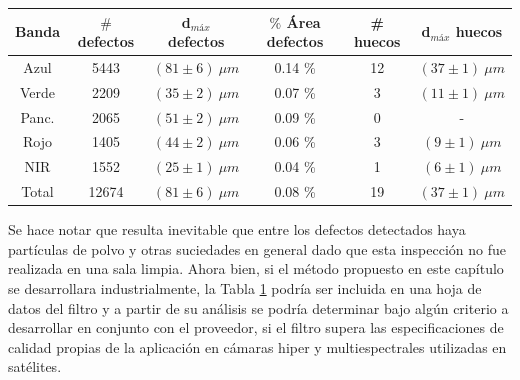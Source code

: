 \begin{table}[H]
\begin{center}
\begin{tabular}{ |c|c|c|c|c|c|}    \toprule
Banda & $\#$ defectos & d$_{máx}$ defectos & $\%$ Área defectos & \# huecos & d$_{máx}$ huecos \\\midrule
\rowcolor{blue!15} Azul   & 5443 & $(81 \pm 6)~ \mu m$ & 0.14 \% &12  & $(37 \pm 1)~ \mu m$  \\ 
\rowcolor{green!50} Verde  & 2209 & $(35 \pm 2)~ \mu m$ & 0.07 \% &3 & $(11 \pm 1)~ \mu m$\\ 
Panc. & 2065 & $(51 \pm 2)~ \mu m$ & 0.09 \% &0 & -\\
\rowcolor{red!50} Rojo  & 1405  &$(44 \pm 2)~ \mu m$& 0.06 \% &3 & $(9 \pm 1)~ \mu m$\\
\rowcolor{maroon!20} NIR   & 1552 & $(25 \pm 1)~ \mu m$ & 0.04 \% &1 & $(6 \pm 1)~ \mu m$ \\ \midrule
Total   & 12674 & $(81 \pm 6)~ \mu m$ & 0.08 \% & 19 & $(37 \pm 1)~ \mu m$ \\
\bottomrule
 \hline
\end{tabular}
\end{center}
 \label{tabpobb}
\end{table}

Se hace notar que resulta inevitable que entre los defectos detectados haya partículas de polvo y otras suciedades en general dado que esta inspección no fue realizada en una sala limpia.  Ahora bien, si el método propuesto en este capítulo se desarrollara industrialmente, la Tabla \ref{tabpobb} podría ser incluida en una hoja de datos del filtro y a partir de su análisis se podría determinar bajo algún criterio a desarrollar en conjunto con el proveedor, si el filtro supera las especificaciones de calidad propias de la aplicación en cámaras hiper y multiespectrales utilizadas en satélites. 

